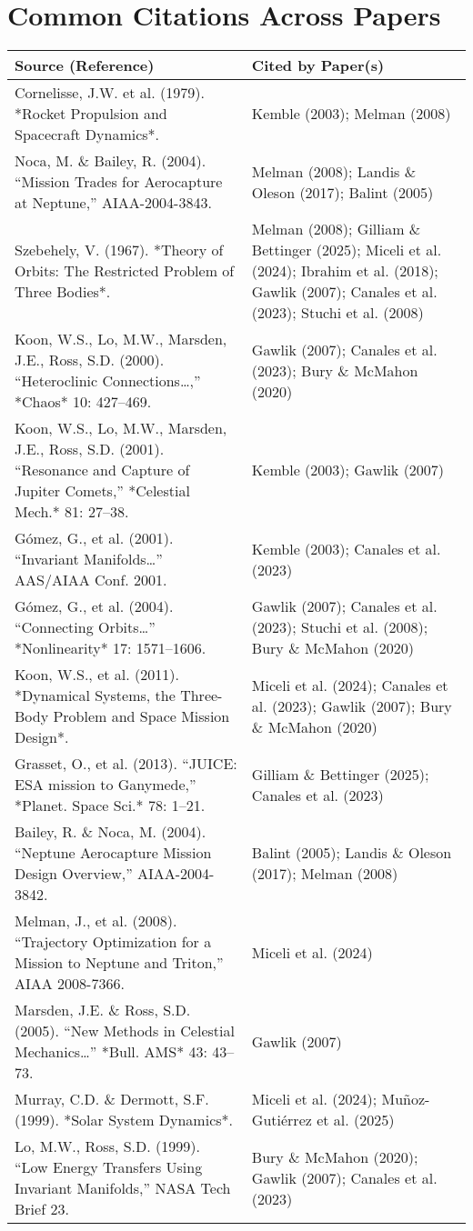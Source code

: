 \documentclass{article}
\begin{document}
\section*{Common Citations Across Papers}

\noindent
\begin{tabularx}{\textwidth}{@{}p{7cm}X@{}}
\toprule
\textbf{Source (Reference)} & \textbf{Cited by Paper(s)} \\
\midrule
Cornelisse, J.W. et al. (1979). *Rocket Propulsion and Spacecraft Dynamics*. & Kemble (2003); Melman (2008) \\
Noca, M. \& Bailey, R. (2004). “Mission Trades for Aerocapture at Neptune,” AIAA-2004-3843. & Melman (2008); Landis \& Oleson (2017); Balint (2005) \\
Szebehely, V. (1967). *Theory of Orbits: The Restricted Problem of Three Bodies*. & Melman (2008); Gilliam \& Bettinger (2025); Miceli et al. (2024); Ibrahim et al. (2018); Gawlik (2007); Canales et al. (2023); Stuchi et al. (2008) \\
Koon, W.S., Lo, M.W., Marsden, J.E., Ross, S.D. (2000). “Heteroclinic Connections…,” *Chaos* 10: 427–469. & Gawlik (2007); Canales et al. (2023); Bury \& McMahon (2020) \\
Koon, W.S., Lo, M.W., Marsden, J.E., Ross, S.D. (2001). “Resonance and Capture of Jupiter Comets,” *Celestial Mech.* 81: 27–38. & Kemble (2003); Gawlik (2007) \\
Gómez, G., et al. (2001). “Invariant Manifolds…” AAS/AIAA Conf. 2001. & Kemble (2003); Canales et al. (2023) \\
Gómez, G., et al. (2004). “Connecting Orbits…” *Nonlinearity* 17: 1571–1606. & Gawlik (2007); Canales et al. (2023); Stuchi et al. (2008); Bury \& McMahon (2020) \\
Koon, W.S., et al. (2011). *Dynamical Systems, the Three-Body Problem and Space Mission Design*. & Miceli et al. (2024); Canales et al. (2023); Gawlik (2007); Bury \& McMahon (2020) \\
Grasset, O., et al. (2013). “JUICE: ESA mission to Ganymede,” *Planet. Space Sci.* 78: 1–21. & Gilliam \& Bettinger (2025); Canales et al. (2023) \\
Bailey, R. \& Noca, M. (2004). “Neptune Aerocapture Mission Design Overview,” AIAA-2004-3842. & Balint (2005); Landis \& Oleson (2017); Melman (2008) \\
Melman, J., et al. (2008). “Trajectory Optimization for a Mission to Neptune and Triton,” AIAA 2008-7366. & Miceli et al. (2024) \\
Marsden, J.E. \& Ross, S.D. (2005). “New Methods in Celestial Mechanics…” *Bull. AMS* 43: 43–73. & Gawlik (2007) \\
Murray, C.D. \& Dermott, S.F. (1999). *Solar System Dynamics*. & Miceli et al. (2024); Muñoz-Gutiérrez et al. (2025) \\
Lo, M.W., Ross, S.D. (1999). “Low Energy Transfers Using Invariant Manifolds,” NASA Tech Brief 23. & Bury \& McMahon (2020); Gawlik (2007); Canales et al. (2023) \\
\bottomrule
\end{tabularx}
\end{document}
